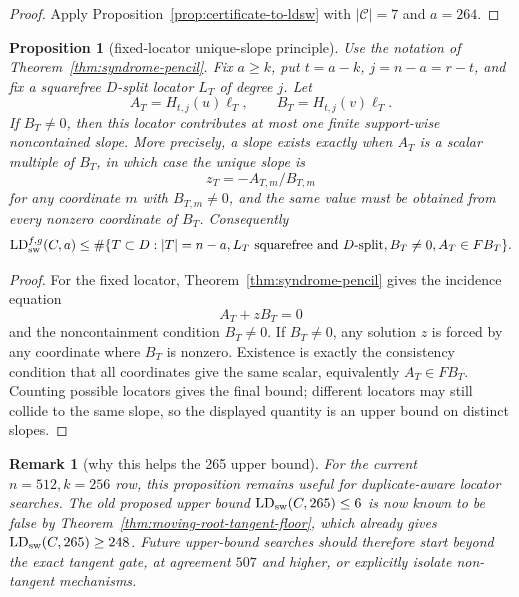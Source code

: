 \documentclass[11pt]{article}
\newtheorem{proposition}{Proposition}
\newtheorem{remark}{Remark}
\begin{document}
\begin{proof}
Apply Proposition~\ref{prop:certificate-to-ldsw} with
\(|\mathcal C|=7\) and \(a=264\).
\end{proof}

\begin{proposition}[fixed-locator unique-slope principle]
\label{prop:fixed-locator-unique-slope}
Use the notation of Theorem~\ref{thm:syndrome-pencil}.  Fix
\(a\ge k\), put \(t=a-k\), \(j=n-a=r-t\), and fix a squarefree
\(D\)-split locator \(L_T\) of degree \(j\).  Let
\[
  A_T=H_{t,j}(u)\boldsymbol\ell_T,
  \qquad
  B_T=H_{t,j}(v)\boldsymbol\ell_T.
\]
If \(B_T\ne0\), then this locator contributes at most one finite
support-wise noncontained slope.  More precisely, a slope exists exactly when
\(A_T\) is a scalar multiple of \(B_T\), in which case the unique slope is
\[
  z_T=-A_{T,m}/B_{T,m}
\]
for any coordinate \(m\) with \(B_{T,m}\ne0\), and the same value must be
obtained from every nonzero coordinate of \(B_T\).
Consequently
\[
  \operatorname{LD}_{\rm sw}^{f,g}(C,a)
  \le
  \#\{T\subset D:
        |T|=n-a,
        L_T\text{ squarefree and }D\text{-split},
        B_T\ne0,
        A_T\in F B_T\}.
\]
\end{proposition}

\begin{proof}
For the fixed locator, Theorem~\ref{thm:syndrome-pencil} gives the incidence
equation
\[
  A_T+zB_T=0
\]
and the noncontainment condition \(B_T\ne0\).  If \(B_T\ne0\), any solution
\(z\) is forced by any coordinate where \(B_T\) is nonzero.  Existence is exactly
the consistency condition that all coordinates give the same scalar, equivalently
\(A_T\in F B_T\).  Counting possible locators gives the final bound; different
locators may still collide to the same slope, so the displayed quantity is an
upper bound on distinct slopes.
\end{proof}

\begin{remark}[why this helps the 265 upper bound]
For the current \(n=512,k=256\) row, this proposition remains useful for
duplicate-aware locator searches.  The old proposed upper bound
\(\operatorname{LD}_{\rm sw}(C,265)\le6\) is now known to be false by
Theorem~\ref{thm:moving-root-tangent-floor}, which already gives
\(\operatorname{LD}_{\rm sw}(C,265)\ge248\).  Future upper-bound searches should
therefore start beyond the exact tangent gate, at agreement \(507\) and higher,
or explicitly isolate non-tangent mechanisms.
\end{remark}
\end{document}
